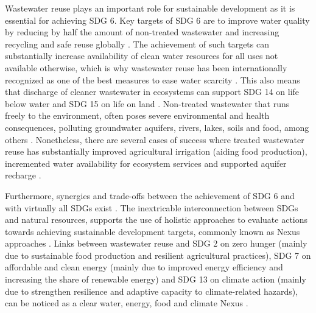 Wastewater reuse plays an important role for sustainable development as it is essential for achieving SDG 6. Key targets of SDG 6 are to improve water quality by reducing by half the amount of non-treated wastewater and increasing recycling and safe reuse globally \cite{UNSDGs2019, tortajadaContributionsRecycledWastewater2020}. The achievement of such targets can substantially increase availability of clean water resources for all uses not available otherwise, which is why wastewater reuse has been internationally recognized as one of the best measures to ease water scarcity \cite{unescoWastewaterUntappedResource2017,GARCIA2015154}. This also means that discharge of cleaner wastewater in ecosystems can support SDG 14 on life below water and SDG 15 on life on land \cite{UNSDGs2019, tortajadaContributionsRecycledWastewater2020}. 
Non-treated wastewater that runs freely to the environment, often poses severe environmental and health consequences, polluting groundwater aquifers, rivers, lakes, soils and food, among others \cite{unescoWastewaterUntappedResource2017}. Nonetheless, there are several cases of success where treated wastewater reuse has substantially improved agricultural irrigation (aiding food production), incremented water availability for ecosystem services and supported aquifer recharge \cite{hettiarachchiSAFEUSEWASTEWATERa, halalshehPolicyGovernanceFramework2018, mahjoubPublicAcceptanceWastewater2018, zuurbierUseWastewaterManaged2018, hussainSustainableUseManagement2019}.

Furthermore, synergies and trade-offs between the achievement of SDG 6 and with virtually all SDGs exist \cite{WaterSanitationInterlinkages2016,unescoWastewaterUntappedResource2017}. The inextricable interconnection between SDGs and natural resources, supports the use of holistic approaches to evaluate actions towards achieving sustainable development targets, commonly known as Nexus approaches \cite{liuNexusApproachesGlobal2018,bleischwitzResourceNexusPerspectives2018,olawuyiSustainableDevelopmentWaterenergyfood2020,simpsonDevelopmentWaterEnergyFoodNexus2019,hoffNexusApproachMENA2019}. Links between wastewater reuse and SDG 2 on zero hunger (mainly due to sustainable food production and resilient agricultural practices), SDG 7 on affordable and clean energy (mainly due to improved energy efficiency and increasing the share of renewable energy) and SDG 13 on climate action (mainly due to strengthen resilience and adaptive capacity to climate-related hazards), can be noticed as a clear water, energy, food and climate Nexus \cite{WaterSanitationInterlinkages2016,liuNexusApproachesGlobal2018,hoffNexusApproachMENA2019}.

